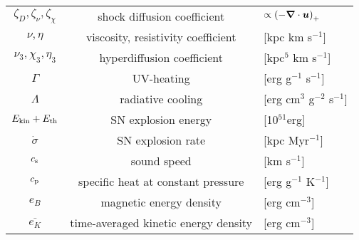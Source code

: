 \documentclass[preprint2]{aastex63}
\newcommand\latex{La\TeX}
\newcommand\ESK{E_{\rm kin}}
\newcommand\EST{E_{\rm th}}
\newcommand{\vect}[1]{{{\mbox{\boldmath $#1$}}}}%
\newcommand{\fag}[1]{\textcolor{midgreen}{FAG: #1}}
\begin{document}
\begin{table*}[h]
\begin{tabular}{ccl}
 $\zeta_{D},\zeta_{\nu},\zeta_{\chi}$ & shock diffusion coefficient& $\propto \left(-\vect\nabla\cdot\vect u\right)_+$\\
 $\nu,\eta$ & viscosity, resistivity coefficient& [kpc km s$^{-1}$]\\
 $\nu_3,\chi_3,\eta_3$ & hyperdiffusion coefficient& [kpc$^{5}$ km s$^{-1}$]\\
 $\Gamma$ & UV-heating& [erg g$^{-1}$ s$^{-1}$]\\
 $\Lambda$ & radiative cooling& [erg cm$^{3}$ g$^{-2}$ s$^{-1}$]\\
 $\ESK+\EST$ & SN explosion energy& [10$^{51}$erg]\\
 $\dot\sigma$ & SN explosion rate & [kpc Myr$^{-1}$]\\
 $c_{\rm s}$ & sound speed & [km s$^{-1}$]\\
 $c_{\rm p}$ & specific heat at constant pressure & [erg g$^{-1}$ K$^{-1}$]\\
 $e_B$ & magnetic energy density & [erg cm$^{-3}$]\\
 $\overline{e_K}$ & time-averaged kinetic energy density & [erg cm$^{-3}$]\\
\hline
\end{tabular}
\end{table*}


\end{document}
